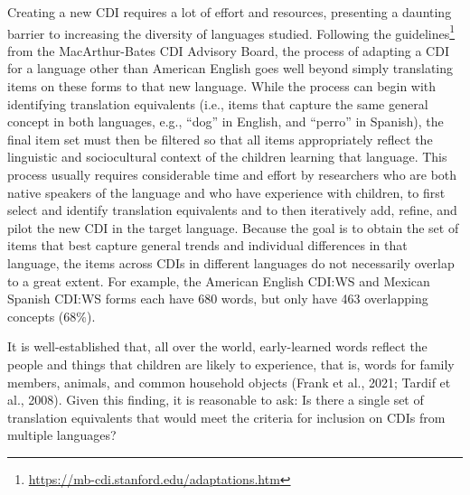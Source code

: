 \documentclass[10pt, letterpaper]{article}
\begin{document}
Creating a new CDI requires a lot of effort and resources, presenting a
daunting barrier to increasing the diversity of languages studied.
Following the guidelines\footnote{\url{https://mb-cdi.stanford.edu/adaptations.htm}}
from the MacArthur-Bates CDI Advisory Board, the process of adapting a
CDI for a language other than American English goes well beyond simply
translating items on these forms to that new language. While the process
can begin with identifying translation equivalents (i.e., items that
capture the same general concept in both languages, e.g., ``dog'' in
English, and ``perro'' in Spanish), the final item set must then be
filtered so that all items appropriately reflect the linguistic and
sociocultural context of the children learning that language. This
process usually requires considerable time and effort by researchers who
are both native speakers of the language and who have experience with
children, to first select and identify translation equivalents and to
then iteratively add, refine, and pilot the new CDI in the target
language. Because the goal is to obtain the set of items that best
capture general trends and individual differences in that language, the
items across CDIs in different languages do not necessarily overlap to a
great extent. For example, the American English CDI:WS and Mexican
Spanish CDI:WS forms each have 680 words, but only have 463 overlapping
concepts (68\%).

It is well-established that, all over the world, early-learned words
reflect the people and things that children are likely to experience,
that is, words for family members, animals, and common household objects
(Frank et al., 2021; Tardif et al., 2008). Given this finding, it is
reasonable to ask: Is there a single set of translation equivalents that
would meet the criteria for inclusion on CDIs from multiple languages?
\end{document}
